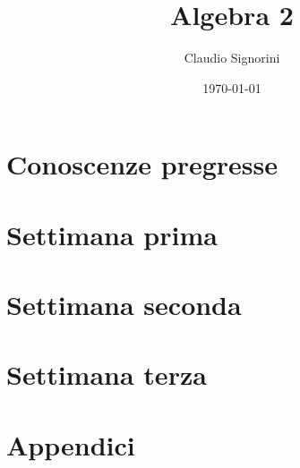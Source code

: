 \documentclass[a4paper,12pt]{book}
\title{Algebra 2}
\author{Claudio Signorini}
\date{\today}
\begin{document}
	
	
	
	\part{Conoscenze pregresse}
	
	
	
	
	
	
	\part{Settimana prima}
	
		
	
	
	
	\part{Settimana seconda}
	
	
	
	
	
	
	

	\part{Settimana terza}
	
	

	\part{Appendici}
	
	

	\printbibliography[heading=bibintoc,title={Bibliografia}]

	\listoffigures

	\tableofcontents
\end{document}
